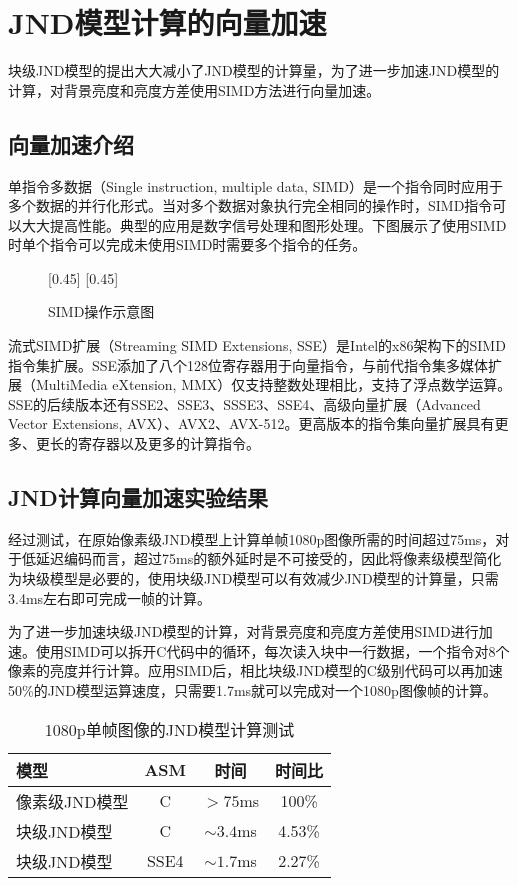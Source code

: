 \section{JND模型计算的向量加速}
	块级JND模型的提出大大减小了JND模型的计算量，为了进一步加速JND模型的计算，对背景亮度和亮度方差使用SIMD方法进行向量加速。
	\subsection{向量加速介绍}
	单指令多数据（Single instruction, multiple data, SIMD）是一个指令同时应用于多个数据的并行化形式。当对多个数据对象执行完全相同的操作时，SIMD指令可以大大提高性能。典型的应用是数字信号处理和图形处理。下图展示了使用SIMD时单个指令可以完成未使用SIMD时需要多个指令的任务。

	\begin{figure}[!hbtp]
		\centering
		[0.45\textwidth]{\resizebox{0.45\textwidth}{!}{}\label{fig:simd1}}
		\hspace{0.7cm}
		[0.45\textwidth]{\resizebox{0.45\textwidth}{!}{}\label{fig:simd2}}
		\caption{SIMD操作示意图}
		\label{fig:simd}
	\end{figure}
	流式SIMD扩展（Streaming SIMD Extensions, SSE）是Intel的x86架构下的SIMD指令集扩展。SSE添加了八个128位寄存器用于向量指令，与前代指令集多媒体扩展（MultiMedia eXtension, MMX）仅支持整数处理相比，支持了浮点数学运算。SSE的后续版本还有SSE2、SSE3、SSSE3、SSE4、高级向量扩展（Advanced Vector Extensions, AVX）、AVX2、AVX-512。更高版本的指令集向量扩展具有更多、更长的寄存器以及更多的计算指令。
	\subsection{JND计算向量加速实验结果}
	经过测试，在原始像素级JND模型上计算单帧1080p图像所需的时间超过75ms，对于低延迟编码而言，超过75ms的额外延时是不可接受的，因此将像素级模型简化为块级模型是必要的，使用块级JND模型可以有效减少JND模型的计算量，只需3.4ms左右即可完成一帧的计算。

	为了进一步加速块级JND模型的计算，对背景亮度和亮度方差使用SIMD进行加速。使用SIMD可以拆开C代码中的循环，每次读入块中一行数据，一个指令对8个像素的亮度并行计算。应用SIMD后，相比块级JND模型的C级别代码可以再加速50\%的JND模型运算速度，只需要1.7ms就可以完成对一个1080p图像帧的计算。

	\begin{table}[!hpt]
		\renewcommand{\arraystretch}{0.9}
		\caption{1080p单帧图像的JND模型计算测试}
		\label{tab:jnd-compute}
		\centering
		\begin{tabular}{lccc} \toprule
			模型 & ASM & 时间 &时间比  \\ \midrule
			像素级JND模型 & C   & $>75$ms & 100\% \\
			块级JND模型   & C & $\sim 3.4$ms & 4.53\% \\
			块级JND模型   & SSE4 & $\sim 1.7$ms & 2.27\%\\ \bottomrule
		\end{tabular}
	\end{table}

